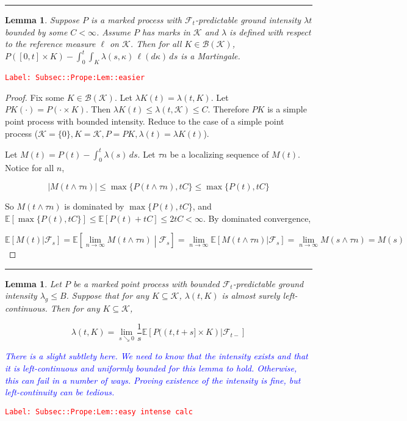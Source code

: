 \documentclass[12pt]{article}
\newcommand{\mb}{\mathbb}
\newcommand{\mc}{\mathcal}
\newcommand{\ms}{\mathscr}
\newcommand{\ra}{\rightarrow}
\newcommand{\tr}{\textcolor{red}}
\newcommand{\tb}{\textcolor{blue}}
\newcommand{\labe}[1]{\tr{\texttt{Label: #1}}}
\newcommand{\lin}{\rule{\linewidth}{0.4 pt}}
\newcommand{\ex}[1]{\mb{E}\left[#1\right]}			%
\renewcommand{\S}{S}							%
\renewcommand{\t}{t}							%
\renewcommand{\tt}{s}							%
\newcommand{\F}{\mc{F}}							%
\newcommand{\ts}[1]{_{#1}}						%
\newcommand{\const}{C}							%
\newcommand{\Sm}{\ell}							%
\newcommand{\rate}{\lambda}						%
\newcommand{\rt}{\tau}							%
\renewcommand{\mark}{\kappa}					%
\newcommand{\rp}{P}								%
\newcommand{\mspce}{\mc{K}}						%
\newtheorem{lem}[thms]{Lemma}
\begin{document}
\lin

\begin{lem}
Suppose \(\rp\) is a marked process with \(\F\ts{\t}\)-predictable ground intensity \(\rate{\t}\) bounded by some \(\const < \infty\). Assume \(\rp\) has marks in \(\mspce\) and \(\rate\) is defined with respect to the reference measure \(\Sm\) on \(\mspce\). Then for all \(K \in \ms{B}(\mspce)\), \(\rp([0,\t]\times K) - \int_0^\t\int_K \rate(\tt,\mark)\,\ell(d\mark)\,ds\) is a Martingale.
\label{Subsec::Prope:Lem::easier}
\end{lem}
\labe{Subsec::Prope:Lem::easier}

\begin{proof}
Fix some \(K \in \ms{B}(\mspce)\). Let \(\rate{K}(\t) = \rate(\t,K)\). Let \(\rp{K}(\cdot) = \rp(\cdot\times K)\). Then \(\rate{K}(\t) \leq \rate(\t,\mspce) \leq \const\). Therefore \(\rp{K}\) is a simple point process with bounded intensity. Reduce to the case of a simple point process (\(\mspce = \{0\}, K = \mspce, \rp = \rp{K},\rate(\t) = \rate{K}(\t)\)).

Let \(M(\t) = \rp(\t) - \int_0^\t \rate(\tt)\,ds\). Let \(\rt{n}\) be a localizing sequence of \(M(\t)\). Notice for all \(n\),

\[|M(\t\wedge \rt{n})| \leq \max\{\rp(\t\wedge \rt{n}),\t\const\}\leq \max\{\rp(\t),\t\const\}\]

So \(M(\t\wedge\rt{n})\) is dominated by \(\max\{\rp(\t),\t\const\}\), and \(\ex{\max\{\rp(\t),\t\const\}} \leq \ex{\rp(\t) + \t\const} \leq 2\t\const < \infty\). By dominated convergence,

\[\ex{M(\t)|\F\ts{\tt}} = \ex{\lim_{n\ra\infty} M(\t\wedge \rt{n})\middle|\F\ts{\tt}} = \lim_{n\ra\infty}\ex{M(\t\wedge \rt{n})|\F\ts{\tt}} = \lim_{n\ra\infty} M(\tt\wedge \rt{n}) = M(\tt)\]
\end{proof}

\lin

\begin{lem}
Let \(\rp\) be a marked point process with bounded \(\F\ts{\t}\)-predictable ground intensity \(\rate_g\leq B\). Suppose that for any \(K \subseteq \mspce\), \(\rate(\t,K)\) is almost surely left-continuous. Then for any \(K \subseteq \mspce\),

\[\rate(\t,K) = \lim_{s\searrow 0}\frac{1}{\tt}\ex{\rp((\t,\t+\tt]\times K)|\F\ts{\t-}}\]

\tb{There is a slight subtlety here. We need to know that the intensity exists and that it is left-continuous and uniformly bounded for this lemma to hold. Otherwise, this can fail in a number of ways. Proving existence of the intensity is fine, but left-continuity can be tedious.}

\label{Subsec::Prope:Lem::easy intense calc}
\end{lem}
\labe{Subsec::Prope:Lem::easy intense calc}
\end{document}
